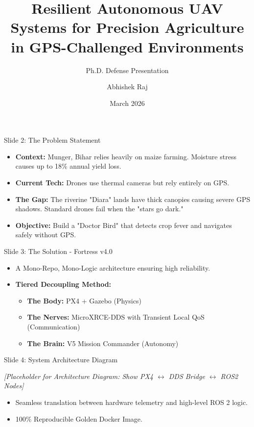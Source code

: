 \documentclass[aspectratio=169, xcolor=table]{beamer}
\title[Resilient Autonomous UAV Systems]{Resilient Autonomous UAV Systems for Precision Agriculture in GPS-Challenged Environments}
\subtitle{Ph.D. Defense Presentation}
\author{Abhishek Raj}
\institute[KIIT University]{KIIT University, Bhubaneswar \\ \vspace{0.2cm} Supervisor: Prof. Pramod Kumar Mullick}
\date{March 2026}
\begin{document}
\begin{frame}
    \titlepage
\end{frame}

\begin{frame}{Slide 2: The Problem Statement}
    \begin{itemize}
        \item \textbf{Context:} Munger, Bihar relies heavily on maize farming. Moisture stress causes up to 18\% annual yield loss.
        \item \textbf{Current Tech:} Drones use thermal cameras but rely entirely on GPS.
        \item \textbf{The Gap:} The riverine "Diara" lands have thick canopies causing severe GPS shadows. Standard drones fail when the "stars go dark."
        \item \textbf{Objective:} Build a "Doctor Bird" that detects crop fever and navigates safely without GPS.
    \end{itemize}
\end{frame}

\begin{frame}{Slide 3: The Solution - Fortress v4.0}
    \begin{itemize}
        \item A Mono-Repo, Mono-Logic architecture ensuring high reliability.
        \item \textbf{Tiered Decoupling Method:}
        \begin{itemize}
            \item \textbf{The Body:} PX4 + Gazebo (Physics)
            \item \textbf{The Nerves:} MicroXRCE-DDS with Transient Local QoS (Communication)
            \item \textbf{The Brain:} V5 Mission Commander (Autonomy)
        \end{itemize}
    \end{itemize}
\end{frame}

\begin{frame}{Slide 4: System Architecture Diagram}
    \begin{center}
        \textit{[Placeholder for Architecture Diagram: Show PX4 $\leftrightarrow$ DDS Bridge $\leftrightarrow$ ROS2 Nodes]}
    \end{center}
    \begin{itemize}
        \item Seamless translation between hardware telemetry and high-level ROS 2 logic.
        \item 100\% Reproducible Golden Docker Image.
    \end{itemize}
\end{frame}
\end{document}
